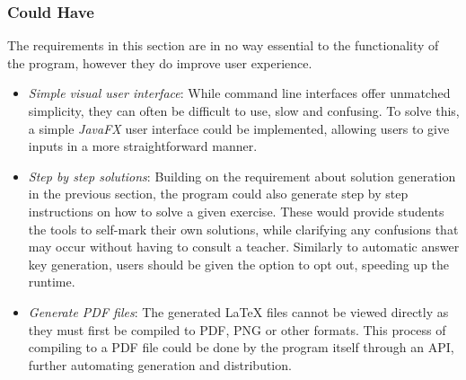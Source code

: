 \documentclass{l4proj}
\begin{document}
\subsubsection{Could Have}
The requirements in this section are in no way essential to the functionality of the program, however they do improve user experience.
\begin{itemize}
	\item
	\emph{Simple visual user interface}: While command line interfaces offer unmatched simplicity, they can often be difficult to use, slow and confusing. To solve this, a simple \emph{JavaFX}   user interface could be implemented, allowing users to give inputs in a more straightforward manner.
	\item
	\emph{Step by step solutions}: Building on the requirement about solution generation in the previous section, the program could also generate step by step instructions on how to solve a given exercise. These would provide students the tools to self-mark their own solutions, while clarifying any confusions that may occur without having to consult a teacher. Similarly to automatic answer key generation, users should be given the option to opt out, speeding up the runtime.
	\item
	\emph{Generate PDF files}: The generated LaTeX files cannot be viewed directly as they must first be compiled to PDF, PNG or other formats. This process of compiling to a PDF file could be done by the program itself through an API, further automating generation and distribution.
\end{itemize}
\end{document}
